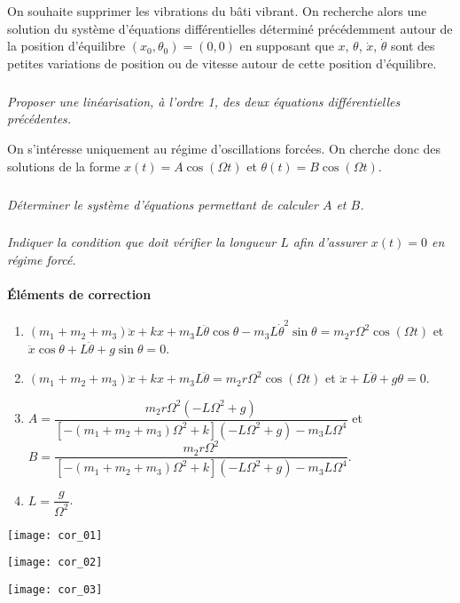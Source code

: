 \begin{multicols}{2}
On souhaite supprimer les vibrations du bâti vibrant. On recherche alors une solution du système d’équations différentielles
déterminé précédemment autour de la position d’équilibre $\left(x_0,\theta_0\right)=(0,0)$ en supposant que $x$, $\theta$, $\dot{x}$, $\dot{\theta}$ sont des petites variations
de position ou de vitesse autour de cette position d’équilibre.


\subparagraph{}
\textit{Proposer une linéarisation, à l’ordre 1, des deux équations différentielles précédentes.}
\ifprof
\begin{corrige}
\end{corrige}
\else
\fi

On s’intéresse uniquement au régime d’oscillations forcées. On cherche donc des solutions de la forme $x(t)=A\cos\left( \Omega t \right)$ et $\theta(t)=B\cos\left( \Omega t \right)$.


\subparagraph{}
\textit{Déterminer le système d’équations permettant de calculer $A$ et $B$.}
\ifprof
\begin{corrige}
\end{corrige}
\else
\fi



\subparagraph{}
\textit{Indiquer la condition que doit vérifier la longueur $L$ afin d’assurer $x(t) = 0$ en régime forcé.}
\ifprof
\begin{corrige}
\end{corrige}
\else
\fi



\vspace{1cm}
\ifcolle
\else
\paragraph*{Éléments de correction}
\footnotesize

\begin{enumerate}
\item $\left( m_1 + m_2 + m_3\right) \ddot{x} + kx + m_3 L\ddot{\theta} \cos \theta - m_3 L\dot{\theta}^2 \sin \theta = m_2 r \Omega^2 \cos \left( \Omega t \right)$ et $\ddot{x}\cos\theta+L\ddot{\theta}+g\sin\theta=0$.
\item $\left( m_1 + m_2 + m_3\right) \ddot{x} + kx + m_3 L\ddot{\theta}= m_2 r \Omega^2 \cos \left( \Omega t \right)$ et $\ddot{x}+L\ddot{\theta}+g\theta=0$.
\item $A=\dfrac{m_2 r \Omega^2 \left( -L\Omega^2 + g\right)}{\left[-\left( m_1 + m_2 + m_3\right)\Omega^2 +k\right]\left( -L\Omega^2 +g\right)-m_3L\Omega^4}$ et 
$B=\dfrac{m_2 r \Omega^2 }{\left[-\left( m_1 + m_2 + m_3\right)\Omega^2 +k\right]\left( -L\Omega^2 +g\right)-m_3L\Omega^4}$.
\item $L=\dfrac{g}{\Omega^2}$.
\end{enumerate}
\normalsize
\fi

\end{multicols}
\fi

\ifprof
\begin{center}
\texttt{[image: cor\_01]}
\end{center}

\begin{center}
\texttt{[image: cor\_02]}
\end{center}

\begin{center}
\texttt{[image: cor\_03]}
\end{center}
\else
\fi